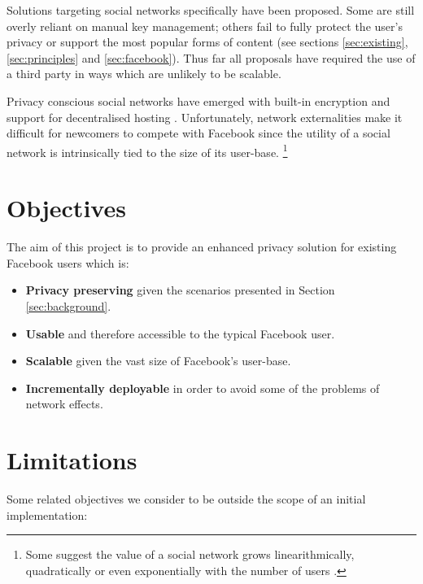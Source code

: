 Solutions targeting social networks specifically have been proposed. Some are still overly reliant on manual key management; others fail to fully protect the user's privacy or support the most popular forms of content (see sections \ref{sec:existing}, \ref{sec:principles} and \ref{sec:facebook}). Thus far all proposals have required the use of a third party in ways which are unlikely to be scalable.
  
Privacy conscious social networks have emerged with built-in encryption and support for decentralised hosting \cite{pidder}\cite{diaspora}. Unfortunately, network externalities make it difficult for newcomers to compete with Facebook since the utility of a social network is intrinsically tied to the size of its user-base. \footnote{Some suggest the value of a social network grows linearithmically, quadratically or even exponentially with the number of users \cite{fb-network} \cite{metcalf}.}


\section{Objectives}
\label{sec:objectives}

The aim of this project is to provide an enhanced privacy solution for existing Facebook users which is:

\begin{itemize}

    \item \textbf{Privacy preserving} given the scenarios presented in Section \ref{sec:background}.

    \item \textbf{Usable} and therefore accessible to the typical Facebook user.

    \item \textbf{Scalable} given the vast size of Facebook's user-base. 
    
    \item \textbf{Incrementally deployable} in order to avoid some of the problems of network effects.

\end{itemize}


\section{Limitations}
\label{sec:limit}

Some related objectives we consider to be outside the scope of an initial implementation:

